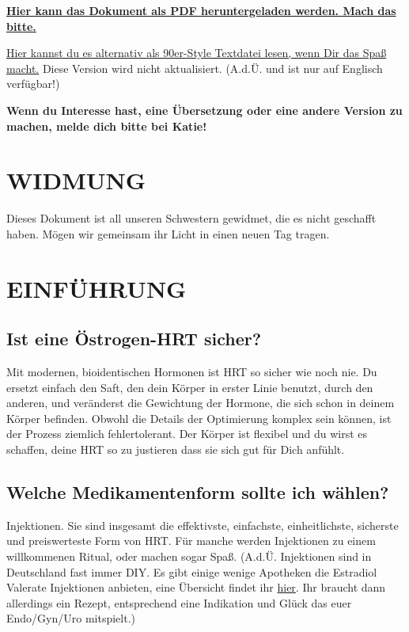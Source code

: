 \documentclass{article}
\begin{document}
\noindent\textbf{\href{pghrt.pdf}{Hier kann das Dokument als PDF heruntergeladen werden. Mach das bitte.}}

\noindent\href{pghrtgretchensversion.txt}{Hier kannst du es alternativ als 90er-Style Textdatei lesen, wenn Dir das Spaß macht.} Diese Version wird nicht aktualisiert. (A.d.Ü. und ist nur auf Englisch verfügbar!)

\noindent\textbf{Wenn du Interesse hast, eine Übersetzung oder eine andere Version zu machen, melde dich bitte bei Katie!}

\section*{WIDMUNG}

Dieses Dokument ist all unseren Schwestern gewidmet, die es nicht geschafft haben. Mögen wir gemeinsam ihr Licht in einen neuen Tag tragen.
 

\section{EINFÜHRUNG}

\subsection{Ist eine Östrogen-HRT sicher?}

Mit modernen, bioidentischen Hormonen ist HRT so sicher wie noch nie. Du ersetzt einfach den Saft, den dein Körper in erster Linie benutzt, durch den anderen, und veränderst die Gewichtung der Hormone, die sich schon in deinem Körper befinden. Obwohl die Details der Optimierung komplex sein können, ist der Prozess ziemlich fehlertolerant. Der Körper ist flexibel und du wirst es schaffen, deine HRT so zu justieren dass sie sich gut für Dich anfühlt.

\subsection{Welche Medikamentenform sollte ich wählen?}

Injektionen. Sie sind insgesamt die effektivste, einfachste, einheitlichste, sicherste und preiswerteste Form von HRT. Für manche werden Injektionen zu einem willkommenen Ritual, oder machen sogar Spaß. (A.d.Ü. Injektionen sind in Deutschland fast immer DIY. Es gibt einige wenige Apotheken die Estradiol Valerate Injektionen anbieten, eine Übersicht findet ihr \href{https://transdb.de/search?type=pharmacy&offers=eInjection}{hier}. Ihr braucht dann allerdings ein Rezept, entsprechend eine Indikation und Glück das euer Endo/Gyn/Uro mitspielt.)
\end{document}
